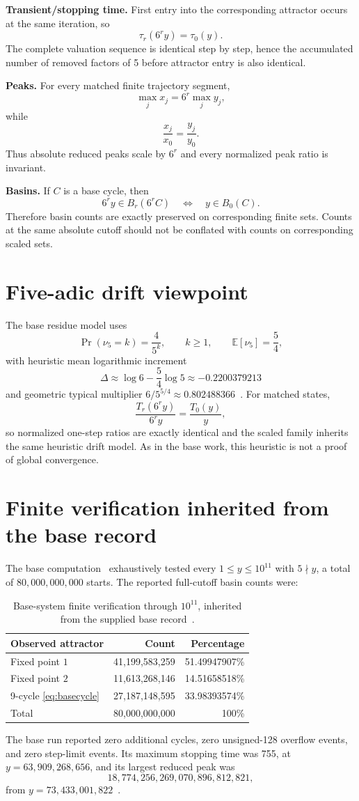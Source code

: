 \documentclass[11pt]{article}
\begin{document}
\textbf{Transient/stopping time.} First entry into the corresponding attractor occurs at the same iteration, so
\[
\tau_r(6^r y)=\tau_0(y).
\]
The complete valuation sequence is identical step by step, hence the accumulated number of removed factors of 5 before attractor entry is also identical.

\textbf{Peaks.} For every matched finite trajectory segment,
\[
\max_j x_j=6^r\max_j y_j,
\]
while
\[
\frac{x_j}{x_0}=\frac{y_j}{y_0}.
\]
Thus absolute reduced peaks scale by $6^r$ and every normalized peak ratio is invariant.

\textbf{Basins.} If $C$ is a base cycle, then
\[
6^r y\in B_r(6^rC)\quad\Longleftrightarrow\quad y\in B_0(C).
\]
Therefore basin counts are exactly preserved on corresponding finite sets. Counts at the same absolute cutoff should not be conflated with counts on corresponding scaled sets.

\section{Five-adic drift viewpoint}
The base residue model uses
\[
\Pr(\nu_5=k)=\frac4{5^k},\qquad k\ge1,\qquad \mathbb E[\nu_5]=\frac54,
\]
with heuristic mean logarithmic increment
\[
\Delta\approx\log6-\frac54\log5\approx-0.2200379213
\]
and geometric typical multiplier $6/5^{5/4}\approx0.802488366$~\cite{BanazadehBase2026}. For matched states,
\[
\frac{T_r(6^r y)}{6^r y}=\frac{T_0(y)}{y},
\]
so normalized one-step ratios are exactly identical and the scaled family inherits the same heuristic drift model. As in the base work, this heuristic is not a proof of global convergence.

\section{Finite verification inherited from the base record}
The base computation~\cite{BanazadehBase2026} exhaustively tested every $1\le y\le10^{11}$ with $5\nmid y$, a total of $80{,}000{,}000{,}000$ starts. The reported full-cutoff basin counts were:
\begin{table}[ht]\centering\small
\begin{tabular}{lrr}\toprule
Observed attractor & Count & Percentage\\\midrule
Fixed point $1$ & 41,199,583,259 & 51.49947907\%\\
Fixed point $2$ & 11,613,268,146 & 14.51658518\%\\
9-cycle \eqref{eq:basecycle} & 27,187,148,595 & 33.98393574\%\\\midrule
Total & 80,000,000,000 & 100\%\\\bottomrule
\end{tabular}
\caption{Base-system finite verification through $10^{11}$, inherited from the supplied base record~\cite{BanazadehBase2026}.}
\end{table}
The base run reported zero additional cycles, zero unsigned-128 overflow events, and zero step-limit events. Its maximum stopping time was 755, at $y=63{,}909{,}268{,}656$, and its largest reduced peak was
\[
18{,}774{,}256{,}269{,}070{,}896{,}812{,}821,
\]
from $y=73{,}433{,}001{,}822$~\cite{BanazadehBase2026}.
\end{document}
